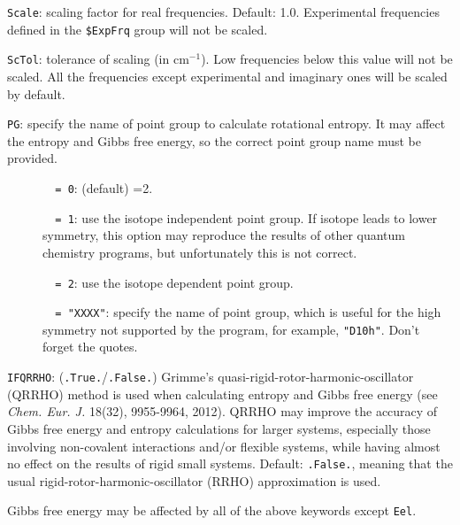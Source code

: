 \documentclass[12pt,english]{extarticle}
\begin{document}
\bigskip{}
\verb|Scale|: scaling factor for real frequencies. Default: 1.0. Experimental frequencies defined in the \texttt{\$ExpFrq} group will not be scaled.

\bigskip{}
\verb|ScTol|: tolerance of scaling (in cm$^{-1}$). Low frequencies below this value will not be scaled. All the frequencies except experimental and imaginary ones will be scaled by default.

\bigskip{}
\verb|PG|: specify the name of point group to calculate rotational
entropy. It may affect the entropy and Gibbs free energy, so the correct point group
name must be provided.
\begin{description}
\item[ ]\verb|  = 0|: (default) =2.
\item[ ]\verb|  = 1|: use the isotope independent point group. If isotope leads to lower symmetry, this option may
reproduce the results of other quantum chemistry programs, but unfortunately this is
not correct.
\item[ ]\verb|  = 2|: use the isotope dependent point group.
\item[ ]\verb|  = "XXXX"|: specify the name of point group, which is useful for the high symmetry not supported by the program, for example, \verb|"D10h"|. Don't forget the quotes.
\end{description}

\bigskip{}
\verb|IFQRRHO|: (\verb|.True.|/\verb|.False.|)
Grimme's quasi-rigid-rotor-harmonic-oscillator (QRRHO) method is used when calculating entropy and Gibbs free energy
(see \textit{Chem. Eur. J.} 18(32), 9955-9964, 2012).
QRRHO may improve the accuracy of Gibbs free energy and entropy calculations for larger systems,
especially those involving non-covalent interactions and/or flexible systems,
while having almost no effect on the results of rigid small systems.
Default: \verb|.False.|, meaning that the usual rigid-rotor-harmonic-oscillator (RRHO) approximation is used.

\bigskip{}
Gibbs free energy may be affected by all of the above keywords except \verb|Eel|.
\end{document}
